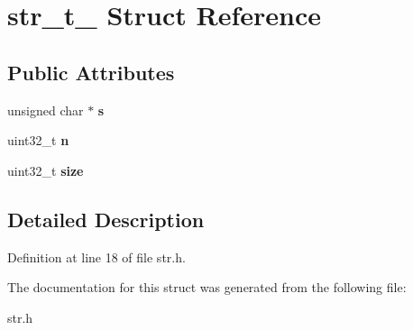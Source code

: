 \hypertarget{structstr__t__}{\section{str\-\_\-t\-\_\- Struct Reference}
\label{structstr__t__}
}
\subsection*{Public Attributes}
\begin{DoxyCompactItemize}
\item 
\hypertarget{structstr__t___a387970e7fe1740768d0f1a25e696c389}{unsigned char $\ast$ {\bfseries s}}\label{structstr__t___a387970e7fe1740768d0f1a25e696c389}

\item 
\hypertarget{structstr__t___a12a22afdb7e0ef7cb756268be0132225}{uint32\-\_\-t {\bfseries n}}\label{structstr__t___a12a22afdb7e0ef7cb756268be0132225}

\item 
\hypertarget{structstr__t___a518e5db90c6f5819a87ecaff4019f377}{uint32\-\_\-t {\bfseries size}}\label{structstr__t___a518e5db90c6f5819a87ecaff4019f377}

\end{DoxyCompactItemize}


\subsection{Detailed Description}


Definition at line 18 of file str.\-h.



The documentation for this struct was generated from the following file\-:\begin{DoxyCompactItemize}
\item 
str.\-h\end{DoxyCompactItemize}
